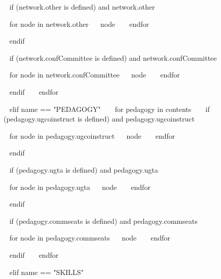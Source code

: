 \begin{minipage}{\textwidth}
  ~{ if (network.other is defined) and network.other }~
  \begin{entrylist}[.1]
    ~{ for node in network.other}~
     \networkentry
      {}
      {~{{ node }}~}
    ~{ endfor }~
  \end{entrylist}
  ~{ endif }~

  ~{ if (network.confCommittee is defined) and network.confCommittee }~
  \begin{entrylist}[.1]
    ~{ for node in network.confCommittee}~
     \networkentry
      {}
      {~{{ node }}~}
    ~{ endfor }~
  \end{entrylist}
  ~{ endif }~
~{ endfor }~



~{ elif name == "PEDAGOGY" }~
~{ for pedagogy in contents }~
  ~{ if (pedagogy.ugcoinstruct is defined) and pedagogy.ugcoinstruct }~
  \begin{entrylist}[.1]
    ~{ for node in pedagogy.ugcoinstruct}~
     \pedentry
      {~{{ node }}~}
    ~{ endfor }~
  \end{entrylist}
  ~{ endif }~

  ~{ if (pedagogy.ugta is defined) and pedagogy.ugta }~
  \begin{entrylist}[.1]
    ~{ for node in pedagogy.ugta}~
     \pedentry
      {~{{ node }}~}
    ~{ endfor }~
  \end{entrylist}
  ~{ endif }~

  ~{ if (pedagogy.commseats is defined) and pedagogy.commseats }~
  \begin{entrylist}[.1]
    ~{ for node in pedagogy.commseats}~
     \pedentry
      {~{{ node }}~}
    ~{ endfor }~
  \end{entrylist}
  ~{ endif }~
~{ endfor }~



~{ elif name == "SKILLS" }~


\end{minipage}
